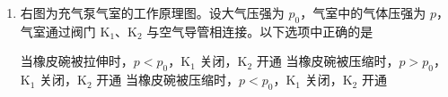 \documentclass[\gkver]{gaokaozhenti}
\begin{document}
\begin{enumerate}

\item
右图为充气泵气室的工作原理图。设大气压强为 $p_{0}$，气室中的气体压强为 $p$，气室通过阀门 $\mathrm{K}_{1}$、$\mathrm{K}_{2}$ 与空气导管相连接。以下选项中正确的是


{当橡皮碗被拉伸时，$p<p_{0}$，$\mathrm{K}_{1}$ 关闭，$\mathrm{K}_{2}$ 开通}
{当橡皮碗被压缩时，$p>p_{0}$，$\mathrm{K}_{1}$ 关闭，$\mathrm{K}_{2}$ 开通}
{当橡皮碗被压缩时，$p<p_{0}$，$\mathrm{K}_{1}$ 关闭，$\mathrm{K}_{2}$ 开通}


\end{enumerate}
\end{document}
